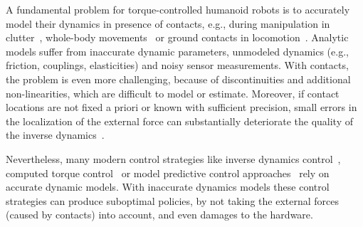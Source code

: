 


A fundamental problem for torque-controlled humanoid robots is to accurately model their dynamics in presence of contacts, e.g., during manipulation in clutter~\cite{Jain2013}, whole-body movements~\cite{Kajita2008} or ground contacts in locomotion~\cite{Calandra2014}.
Analytic models suffer from inaccurate dynamic parameters, unmodeled dynamics (e.g., friction, couplings, elasticities) and noisy sensor measurements.
With contacts, the problem is even more challenging, because of discontinuities and additional non-linearities, which are difficult to model or estimate.
Moreover, if contact locations are not fixed a priori or known with sufficient precision, small errors in the localization of the external force can substantially deteriorate the quality of the inverse dynamics~\cite{DelPrete2012}.

Nevertheless, many modern control strategies like inverse dynamics control~\cite{Erez2012}, computed torque control~\cite{Siciliano2009} or model predictive control approaches~\cite{Naveau2014} rely on accurate dynamic models.
With inaccurate dynamics models these control strategies can produce suboptimal policies, by not taking the external forces (caused by contacts) into account, and even damages to the hardware.

